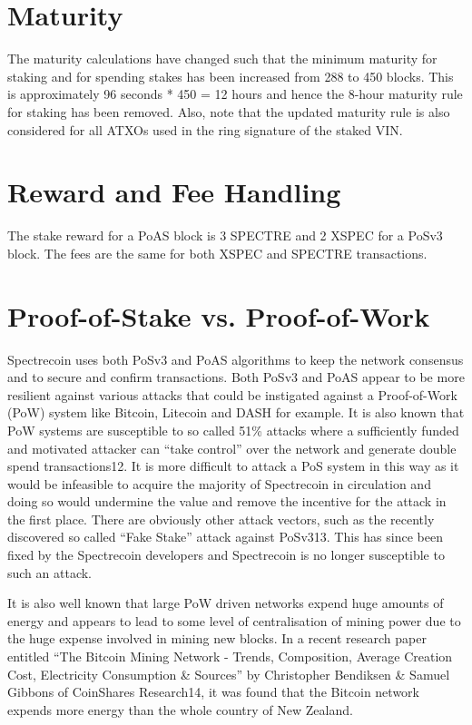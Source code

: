 \section{Maturity}
The maturity calculations have changed such that the minimum maturity for
staking and for spending stakes has been increased from 288 to 450 blocks.
This is approximately 96 seconds * 450 = 12 hours and hence the 8-hour
maturity rule for staking has been removed. Also, note that the updated
maturity rule is also considered for all ATXOs used in the ring signature
of the staked VIN.



\section{Reward and Fee Handling}
The stake reward for a PoAS block is 3 SPECTRE and 2 XSPEC for a PoSv3 block.
The fees are the same for both XSPEC and SPECTRE transactions.



\section{Proof-of-Stake vs. Proof-of-Work}
Spectrecoin uses both PoSv3 and PoAS algorithms to keep the network consensus
and to secure and confirm transactions. Both PoSv3 and PoAS appear to be more
resilient against various attacks that could be instigated against a
Proof-of-Work (PoW) system like Bitcoin, Litecoin and DASH for example.
It is also known that PoW systems are susceptible to so called 51\% attacks
where a sufficiently funded and motivated attacker can “take control” over
the network and generate double spend transactions12. It is more difficult
to attack a PoS system in this way as it would be infeasible to acquire the
majority of Spectrecoin in circulation and doing so would undermine the value
and remove the incentive for the attack in the first place. There are obviously
other attack vectors, such as the recently discovered so called “Fake Stake”
attack against PoSv313. This has since been fixed by the Spectrecoin developers
and Spectrecoin is no longer susceptible to such an attack.



It is also well known that large PoW driven networks expend huge amounts of
energy and appears to lead to some level of centralisation of mining power
due to the huge expense involved in mining new blocks. In a recent research
paper entitled “The Bitcoin Mining Network - Trends, Composition, Average
Creation Cost, Electricity Consumption \& Sources” by Christopher Bendiksen
\& Samuel Gibbons of CoinShares Research14, it was found that the Bitcoin
network expends more energy than the whole country of New Zealand.



